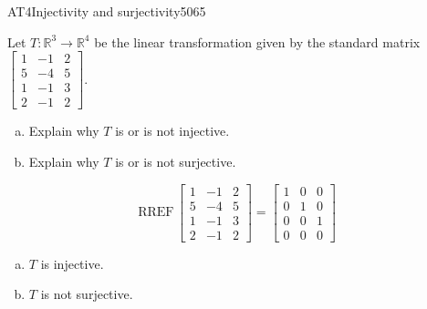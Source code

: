 \begin{exercise}{AT4}{Injectivity and surjectivity}{5065} 
\begin{exerciseStatement} 

 Let \(T:\mathbb{R}^3 \to \mathbb{R}^4\) be the linear transformation given by the standard matrix \(\left[\begin{array}{ccc}
1 & -1 & 2 \\
5 & -4 & 5 \\
1 & -1 & 3 \\
2 & -1 & 2
\end{array}\right]\). 

 

\begin{enumerate}[(a)]
\item 

Explain why \(T\) is or is not injective.


\item 

Explain why \(T\) is or is not surjective.


\end{enumerate}

     \end{exerciseStatement}
 \begin{exerciseAnswer} 

\[\mathrm{RREF}\,\left[\begin{array}{ccc}
1 & -1 & 2 \\
5 & -4 & 5 \\
1 & -1 & 3 \\
2 & -1 & 2
\end{array}\right]=\left[\begin{array}{ccc}
1 & 0 & 0 \\
0 & 1 & 0 \\
0 & 0 & 1 \\
0 & 0 & 0
\end{array}\right]\]

 

\begin{enumerate}[(a)]
\item  

\(T\) is injective.

 
\item  

\(T\) is not surjective.

 
\end{enumerate}

     \end{exerciseAnswer}
 \end{exercise}


